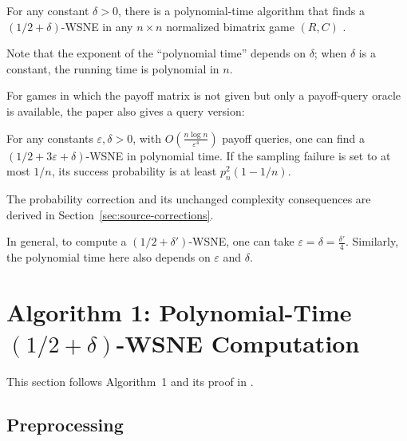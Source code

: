 \begin{theorem}
  \label{thm:finding-bimat-game-12_del-wsne-is-poly-time}
  For any constant $\delta > 0$, there is a polynomial-time algorithm that finds a $(1/2 + \delta)$-WSNE in any $n \times n$ normalized bimatrix game $(R, C)$ \cite[Theorem~1]{12WSNE}.
\end{theorem}

Note that the exponent of the ``polynomial time'' depends on $\delta$; when $\delta$ is a constant, the running time is polynomial in $n$.

For games in which the payoff matrix is not given but only a payoff-query oracle is available, the paper also gives a query version:

\begin{theorem}
  \label{thm:query-efficient-version}
  For any constants $\varepsilon, \delta > 0$, with $O\left( \frac{n \log n}{\varepsilon^4} \right)$ payoff queries, one can find a $(1/2 + 3\varepsilon + \delta)$-WSNE in polynomial time. If the sampling failure is set to at most $1/n$, its success probability is at least $p_n^2(1-1/n)$.
\end{theorem}

The probability correction and its unchanged complexity consequences are derived in Section~\ref{sec:source-corrections}.

In general, to compute a $(1/2 + \delta')$-WSNE, one can take $\varepsilon = \delta = \frac{\delta'}{4}$. Similarly, the polynomial time here also depends on $\varepsilon$ and $\delta$.

\section{Algorithm 1: Polynomial-Time \texorpdfstring{$(1/2 + \delta)$}{1/2 + δ}-WSNE Computation}

This section follows Algorithm~1 and its proof in \cite[Section~3]{12WSNE}.

\subsection{Preprocessing}

